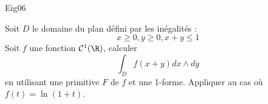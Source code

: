 \begin{tiny}Eig06\end{tiny}
Soit $D$ le domaine du plan défini par les inégalités :
\begin{displaymath}
  x\geq 0,y\geq 0, x+y\leq 1
\end{displaymath}
Soit $f$ une fonction $\mathcal C^1(\R)$, calculer
\begin{displaymath}
 \int_D f(x+y)dx\wedge dy
\end{displaymath}
en utilisant une primitive $F$ de $f$ et une 1-forme. Appliquer au cas où
$ f(t)=\ln (1+t) $.
